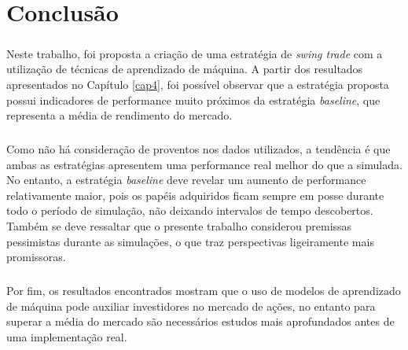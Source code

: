 \chapter{Conclusão}
\label{cap5}



\paragraph{} Neste trabalho, foi proposta a criação de uma estratégia de \textit{swing trade} com a utilização de técnicas de aprendizado de máquina. A partir dos resultados apresentados no Capítulo \ref{cap4}, foi possível observar que a estratégia proposta possui indicadores de performance muito próximos da estratégia \textit{baseline}, que representa a média de rendimento do mercado.

\paragraph{} Como não há consideração de proventos nos dados utilizados, a tendência é que ambas as estratégias apresentem uma performance real melhor do que a simulada. No entanto, a estratégia \textit{baseline} deve revelar um aumento de performance relativamente maior, pois os papéis adquiridos ficam sempre em posse durante todo o período de simulação, não deixando intervalos de tempo descobertos. Também se deve ressaltar que o presente trabalho considerou premissas pessimistas durante as simulações, o que traz perspectivas ligeiramente mais promissoras.

\paragraph{} Por fim, os resultados encontrados mostram que o uso de modelos de aprendizado de máquina pode auxiliar investidores no mercado de ações, no entanto para superar a média do mercado são necessários estudos mais aprofundados antes de uma implementação real.

